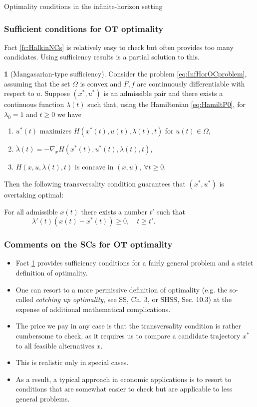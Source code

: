 \documentclass[10pt]{beamer}
\theoremstyle{definition}
\newtheorem{Fact}{\translate{Fact}}
\begin{document}
\begin{section}{Optimality conditions in the infinite-horizon setting}
\begin{frame}[fragile]
\frametitle{Sufficient conditions for OT optimality}
Fact \ref{fc:HalkinNCs} is relatively easy to check but often provides too many candidates. Using sufficiency results is a partial solution to this. \pause

\begin{Fact}[Mangasarian-type sufficiency]
Consider the problem \eqref{eq:InfHorOCproblem}, assuming that the set $ \Omega $ is convex and $ F,f $ are continuously differentiable with respect to $ u $. Suppose $ (x^*,u^*) $ is an admissible pair and there exists a continuous function $ \lambda(t) $ such that, using the Hamiltonian \eqref{eq:HamiltP0}, for $ \lambda_0=1 $ and $ t\geq 0 $ we have
\begin{enumerate}
\item $ u^*(t) $ maximizes $ H(x^*(t),u(t),\lambda(t),t )$ for $ u(t)\in \Omega $,
\item $ \dot{\lambda}(t) = -\nabla_x H(x^*(t),u^*(t),\lambda(t),t) $,
\item $ H(x,u,\lambda(t),t ) $ is concave in $ (x,u),~\forall t \geq 0 $.
\end{enumerate}

Then the following transversality condition guarantees that $ (x^*,u^*) $ is overtaking optimal:

For all admissible $ x(t) $ there exists a number $ t' $ such that \newline
${} \qquad \qquad \lambda'(t) (x(t)-x^*(t))\geq 0,\quad t\geq t'. $ 
\label{fc:SCsOT}
\end{Fact}
\end{frame}

\begin{frame}[fragile]
\frametitle{Comments on the SCs for OT optimality}
\begin{itemize}\itemsep1em
\item Fact \ref{fc:SCsOT} provides sufficiency conditions for a fairly general problem and a strict definition of optimality.
\item One can resort to a more permissive definition of optimality (e.g. the so-called \emph{catching up optimality}, see SS, Ch. 3, or SHSS, Sec. 10.3) at the expense of additional mathematical complications.
\item The price we pay in any case is that the transversality condition is rather cumbersome to check, as it requires us to compare a candidate trajectory $ x^* $ to all feasible alternatives $ x $.
\item This is realistic only in special cases.
\item As a result, a typical approach in economic applications is to resort to conditions that are somewhat easier to check but are applicable to less general problems.
\end{itemize}
\end{frame}


\end{section}
\end{document}
